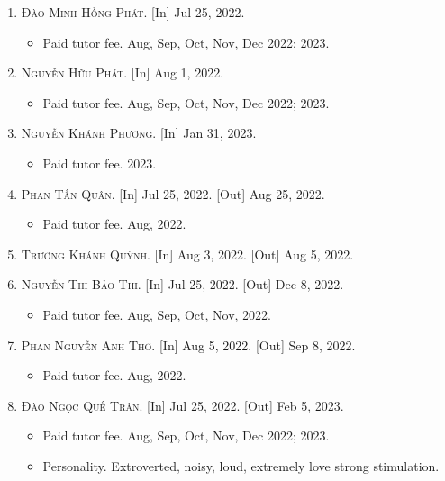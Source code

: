 \documentclass{article}
\numberwithin{equation}{section}
\begin{document}
\begin{enumerate}
\begin{itemize}
	\end{itemize}
	\item \textsc{Đào Minh Hồng Phát.} \textsf{[In]} Jul 25, 2022.
	\begin{itemize}
		\item \textsf{Paid tutor fee.} Aug, Sep, Oct, Nov, Dec 2022; 2023.
	\end{itemize}
	\item \textsc{Nguyễn Hữu Phát.} \textsf{[In]} Aug 1, 2022.
	\begin{itemize}
		\item \textsf{Paid tutor fee.} Aug, Sep, Oct, Nov, Dec 2022; 2023.
	\end{itemize}
	\item \textsc{Nguyễn Khánh Phương.}  \textsf{[In]} Jan 31, 2023.
	\begin{itemize}
		\item \textsf{Paid tutor fee.} 2023.
	\end{itemize}
	\item \textsc{Phan Tấn Quân.} \textsf{[In]} Jul 25, 2022. \textsf{[Out]} Aug 25, 2022.
	\begin{itemize}
		\item \textsf{Paid tutor fee.} Aug, 2022.
	\end{itemize}
	\item \textsc{Trương Khánh Quỳnh.} \textsf{[In]} Aug 3, 2022. \textsf{[Out]} Aug 5, 2022.
	\item \textsc{Nguyễn Thị Bảo Thi.} \textsf{[In]} Jul 25, 2022. \textsf{[Out]} Dec 8, 2022.
	\begin{itemize}
		\item \textsf{Paid tutor fee.} Aug, Sep, Oct, Nov, 2022.
	\end{itemize}
	\item \textsc{Phan Nguyễn Anh Thơ.} \textsf{[In]} Aug 5, 2022. \textsf{[Out]} Sep 8, 2022.
	\begin{itemize}
		\item \textsf{Paid tutor fee.} Aug, 2022.
	\end{itemize}
	\item \textsc{Đào Ngọc Quế Trân.} \textsf{[In]} Jul 25, 2022. \textsf{[Out]} Feb 5, 2023.
	\begin{itemize}
		\item \textsf{Paid tutor fee.} Aug, Sep, Oct, Nov, Dec 2022; 2023.
		\item \textsf{Personality.} Extroverted, noisy, loud, extremely love strong stimulation.
	\end{itemize}

\end{enumerate}
\end{document}
